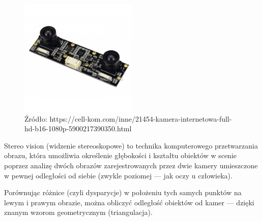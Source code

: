 \documentclass[magisterska]{pracadypl}
\begin{document}
\begin{figure}[h]  %
    \centering  %
    \includegraphics[width=0.5\textwidth]{images/STEREO.jpg}  %
    \captionsetup{labelformat=empty, font=footnotesize}
    \caption{Źródło: https://cell-kom.com/inne/21454-kamera-internetowa-full-hd-b16-1080p-5900217390350.html}
    \label{fig:mono}  %
\end{figure}

Stereo vision (widzenie stereoskopowe) to technika komputerowego przetwarzania obrazu, która umożliwia określenie głębokości i kształtu obiektów w scenie poprzez analizę dwóch obrazów zarejestrowanych przez dwie kamery umieszczone w pewnej odległości od siebie (zwykle poziomej — jak oczy u człowieka).

Porównując różnice (czyli dysparycje) w położeniu tych samych punktów na lewym i prawym obrazie, można obliczyć odległość obiektów od kamer — dzięki znanym wzorom geometrycznym (triangulacja).
\end{document}
